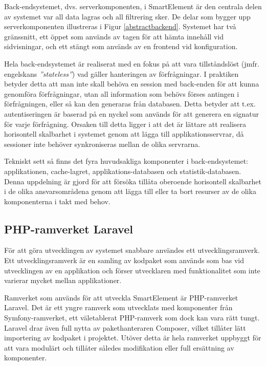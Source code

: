 Back-endsystemet, dvs. serverkomponenten, i SmartElement är den centrala delen av systemet var all data lagras och all filtrering sker. De delar som bygger upp serverkomponenten illustreras i Figur \ref{abstractbackend}. Systemet har två gränssnitt, ett öppet som används av tagen för att hämta innehåll vid sidvisningar, och ett stängt som används av en frontend vid konfiguration.

Hela back-endsystemet är realiserat med en fokus på att vara tillståndslöst (jmfr. engelskans \textit{''stateless''}) vad gäller hanteringen av förfrågningar. I praktiken betyder detta att man inte skall behöva en session med back-enden för att kunna genomföra förfrågningar, utan all information som behövs förses antingen i förfrågningen, eller så kan den generaras från databasen. Detta betyder att t.ex. autentiseringen är baserad på en nyckel som används för att generera en signatur för varje förfrågning. Orsaken till detta ligger i att det är lättare att realisera horisontell skalbarhet i systemet genom att lägga till applikationsservrar, då sessioner inte behöver synkroniseras mellan de olika servrarna.

Tekniskt sett så finns det fyra huvudsakliga komponenter i back-endsystemet: applikationen, cache-lagret, applikations-databasen och statistik-databasen. Denna uppdelning är gjord för att försöka tillåta oberoende horisontell skalbarhet i de olika ansvarsområdena genom att lägga till eller ta bort resurser av de olika komponenterna i takt med behov.

\subsection{PHP-ramverket Laravel}

För att göra utvecklingen av systemet snabbare användes ett utvecklingsramverk. Ett utvecklingsramverk är en samling av kodpaket som används som bas vid utvecklingen av en applikation och förser utvecklaren med funktionalitet som inte varierar mycket mellan applikationer.

Ramverket som används för att utveckla SmartElement är PHP-ramverket Laravel. Det är ett yngre ramverk som utvecklats med komponenter från Symfony-ramverket, ett väletablerat PHP-ramverk som dock kan vara rätt tungt. Laravel drar även full nytta av pakethanteraren Composer, vilket tillåter lätt importering av kodpaket i projektet. Utöver detta är hela ramverket uppbyggt för att vara modulärt och tillåter således modifikation eller full ersättning av komponenter.

